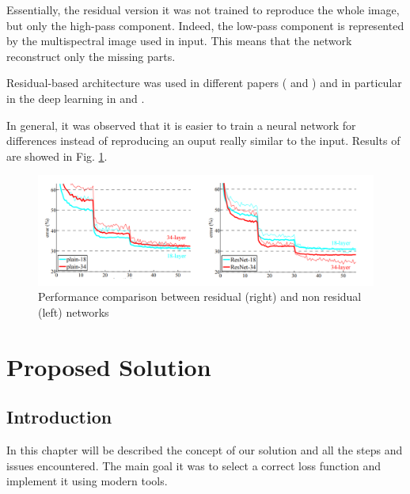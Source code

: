 \documentclass[12pt]{report}
\begin{document}
Essentially, the residual version it was not trained to reproduce the whole image,
but only the high-pass component. Indeed, the low-pass component is represented by the 
multispectral image used in input. This means that the network reconstruct only the missing parts.

Residual-based architecture was used in different papers ( \cite{residual1} and \cite{residual2})
and in particular in the deep learning in \cite{residual3} and \cite{residual4}.

In general, it was observed that it is easier to train a neural network for differences
instead of reproducing an ouput really similar to the input. 
Results of \cite{residual4} are showed in Fig. \ref{fig:residual-comparison}.


\begin{figure}[t]
    \centering
    \includegraphics[scale=.35]{residual_comparison.png}
    \caption{Performance comparison between residual (right) and non residual (left) networks \cite{residual4}}
    \label{fig:residual-comparison}
\end{figure}

\newpage

\chapter{Proposed Solution}

\section{Introduction}

In this chapter will be described the concept of our solution and all the steps and issues encountered.
The main goal it was to select a correct loss function and implement it using modern tools.
\end{document}
